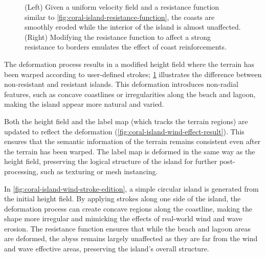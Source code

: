 \begin{figure}
    \caption[An island deformed with and without resistance]{(Left) Given a uniform velocity field and a resistance function similar to \cref{fig:coral-island-resistance-function}, the coasts are smoothly eroded while the interior of the island is almost unaffected. (Right) Modifying the resistance function to affect a strong resistance to borders emulates the effect of coast reinforcements.}
    \label{fig:coral-island-strong-low-resistance}
\end{figure}

The deformation process results in a modified height field where the terrain has been warped according to user-defined strokes; \cref{fig:coral-island-strong-low-resistance} illustrates the difference between non-resistant and resistant islands. This deformation introduces non-radial features, such as concave coastlines or irregularities along the beach and lagoon, making the island appear more natural and varied.

Both the height field and the label map (which tracks the terrain regions) are updated to reflect the deformation (\cref{fig:coral-island-wind-effect-result}). This ensures that the semantic information of the terrain remains consistent even after the terrain has been warped. The label map is deformed in the same way as the height field, preserving the logical structure of the island for further post-processing, such as texturing or mesh instancing.

In \cref{fig:coral-island-wind-stroke-edition}, a simple circular island is generated from the initial height field. By applying strokes along one side of the island, the deformation process can create concave regions along the coastline, making the shape more irregular and mimicking the effects of real-world wind and wave erosion. The resistance function ensures that while the beach and lagoon areas are deformed, the abyss remains largely unaffected as they are far from the wind and wave effective areas, preserving the island's overall structure.

